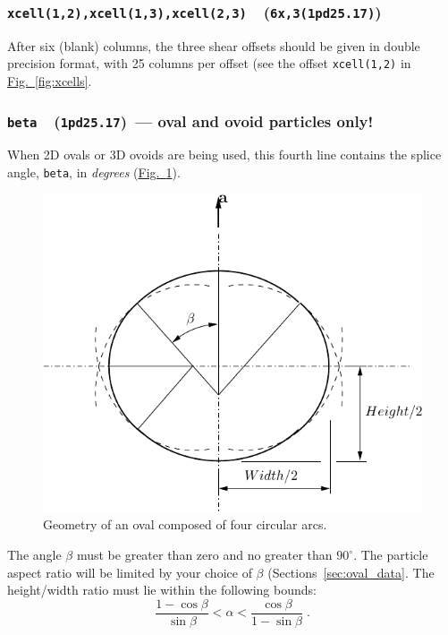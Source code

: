 \documentclass[letterpaper,11pt]{article}
\newcommand{\Var}[2]{\texttt{#1}\ \  (\texttt{#2})}
\begin{document}
\subsubsection[\texttt{xcell(1,2)}]{\Var{xcell(1,2),xcell(1,3),xcell(2,3)}{6x,3(1pd25.17)}}%
\label{sec:xcell12}
After six (blank) columns, the
three shear offsets should be given in double precision format, 
with 25 columns per offset (see the
offset \texttt{xcell(1,2)} in
\hyperref[fig:xcells]{Fig.~\ref*{fig:xcells}}.
%
\subsubsection[\texttt{beta}]{\Var{beta}{1pd25.17}\ --- oval 
and ovoid particles only!}\label{sec:beta}
When 2D ovals or 3D ovoids are being used, this fourth line contains the
splice angle, \texttt{beta}, in \emph{degrees}
(\hyperref[fig:four_arc]{Fig.~\ref*{fig:four_arc}}).
%
\begin{figure}
  \centering
  \includegraphics{Figures/four_arc.pdf}
  \caption{Geometry of an oval composed of four circular arcs.}
  \label{fig:four_arc}
\end{figure}
%
The angle $\beta$ must be greater than zero and no greater than $90^{\circ}$.
The particle aspect ratio will be limited by your choice of $\beta$
(Sections~\hyperref[sec:oval_data]{\ref*{sec:oval_data}}.
The height/width ratio must lie within the following bounds:
\begin{equation}
\frac{1-\cos\beta}{\sin\beta} < \alpha <%
\frac{\cos\beta}{1-\sin\beta} \;.
\end{equation}
%
\end{document}
